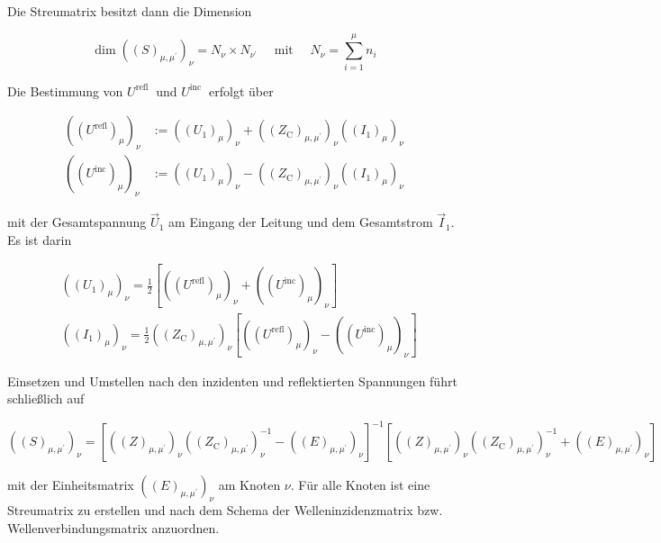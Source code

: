 Die Streumatrix besitzt dann die Dimension


\begin{equation}
	\operatorname{dim}\left((S)_{\mu, \mu^{\prime}}\right)_{\nu}=N_{\nu} \times N_{\nu^{\prime}} \quad \text { mit } \quad N_{\nu}=\sum_{i=1}^{\mu} n_{i} 
\end{equation}


Die Bestimmung von $U^{\text {refl }}$ und $U^{\text {inc }}$ erfolgt über


\begin{align}
	\left(\left(U^{\mathrm{refl}}\right)_{\mu}\right)_{\nu} & :=\left(\left(U_{1}\right)_{\mu}\right)_{\nu}+\left(\left(Z_{\mathrm{C}}\right)_{\mu, \mu^{\prime}}\right)_{\nu}\left(\left(I_{1}\right)_{\mu}\right)_{\nu}  \\
	\left(\left(U^{\mathrm{inc}}\right)_{\mu}\right)_{\nu} & :=\left(\left(U_{1}\right)_{\mu}\right)_{\nu}-\left(\left(Z_{\mathrm{C}}\right)_{\mu, \mu^{\prime}}\right)_{\nu}\left(\left(I_{1}\right)_{\mu}\right)_{\nu} 
\end{align}


mit der Gesamtspannung $\vec{U}_{1}$ am Eingang der Leitung und dem Gesamtstrom $\vec{I}_{1}$. Es ist darin


\begin{align}
	&\left(\left(U_{1}\right)_{\mu}\right)_{\nu}=\frac{1}{2}\left[\left(\left(U^{\mathrm{refl}}\right)_{\mu}\right)_{\nu}+\left(\left(U^{\mathrm{inc}}\right)_{\mu}\right)_{\nu}\right]  \\
	&\left(\left(I_{1}\right)_{\mu}\right)_{\nu}=\frac{1}{2}\left(\left(Z_{\mathrm{C}}\right)_{\mu, \mu^{\prime}}\right)_{\nu}\left[\left(\left(U^{\mathrm{refl}}\right)_{\mu}\right)_{\nu}-\left(\left(U^{\mathrm{inc}}\right)_{\mu}\right)_{\nu}\right] 
\end{align}


Einsetzen und Umstellen nach den inzidenten und reflektierten Spannungen führt schließlich auf


\begin{equation}
	\left((S)_{\mu, \mu^{\prime}}\right)_{\nu}=\left[\left((Z)_{\mu, \mu^{\prime}}\right)_{\nu}\left(\left(Z_{\mathrm{C}}\right)_{\mu, \mu^{\prime}}\right)_{\nu}^{-1}-\left((E)_{\mu, \mu^{\prime}}\right)_{\nu}\right]^{-1}\left[\left((Z)_{\mu, \mu^{\prime}}\right)_{\nu}\left(\left(Z_{\mathrm{C}}\right)_{\mu, \mu^{\prime}}\right)_{\nu}^{-1}+\left((E)_{\mu, \mu^{\prime}}\right)_{\nu}\right] 
\end{equation}


mit der Einheitsmatrix $\left((E)_{\mu, \mu^{\prime}}\right)_{\nu}$ am Knoten $\nu$. Für alle Knoten ist eine Streumatrix zu erstellen und nach dem Schema der Welleninzidenzmatrix bzw. Wellenverbindungsmatrix anzuordnen.

